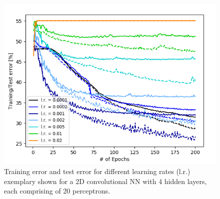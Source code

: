 \documentclass[a4paper, 12pt, conference]{article}
\begin{document}
\begin{figure}[H]
	\centering
  \includegraphics[scale=0.5]{DetLearnRate2DConvNN20PerceptFinal.png}
  \caption{Training error and test error for different learning rates (l.r.) exemplary shown for a 2D convolutional NN with 4 hidden layers, each comprising of 20 perceptrons.}
  \label{fig::DeterminationLearningRate2DConvNN}
\end{figure}
\end{document}
